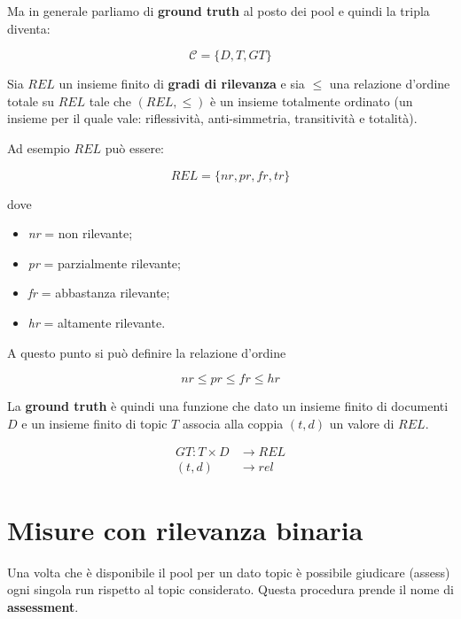 \noindent Ma in generale parliamo di \textbf{ground truth} al posto dei pool e quindi la tripla diventa:

$$
\mathcal{C} = \{D, T, GT\}
$$

\noindent Sia $REL$ un insieme finito di \textbf{gradi di rilevanza} e sia $\leq$ una relazione d'ordine totale su $REL$ tale che $(REL, \leq)$ è un insieme totalmente ordinato (un insieme per il quale vale: riflessività, anti-simmetria, transitività e totalità).

Ad esempio $REL$ può essere:

$$
REL = \{nr, pr, fr, tr \}
$$

\noindent dove 
\begin{itemize}
	\item \textit{nr} = non rilevante;
	\item \textit{pr} = parzialmente rilevante;
	\item \textit{fr} = abbastanza rilevante;
	\item \textit{hr} = altamente rilevante.
\end{itemize}

\noindent A questo punto si può definire la relazione d'ordine

$$
nr \leq pr \leq fr \leq hr
$$

La \textbf{ground truth} è quindi una funzione che dato un insieme finito di documenti $D$ e un insieme finito di topic $T$ associa alla coppia $(t,d)$ un valore di $REL$.

\begin{align*}
	GT : T \times D &\to REL \\
		(t,d) &\to rel
\end{align*}

\section{Misure con rilevanza binaria}

Una volta che è disponibile il pool per un dato topic è possibile giudicare (assess) ogni singola run rispetto al topic considerato.
Questa procedura prende il nome di \textbf{assessment}.


